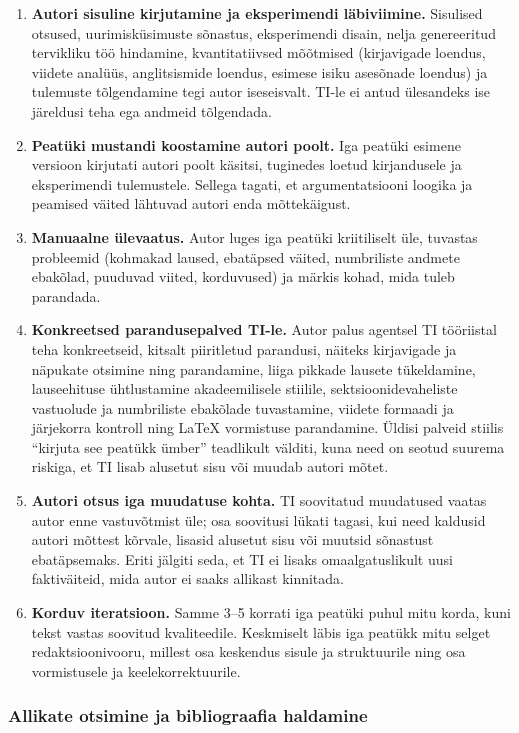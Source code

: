 \begin{enumerate}
    \item \textbf{Autori sisuline kirjutamine ja eksperimendi läbiviimine.} Sisulised otsused, uurimisküsimuste sõnastus, eksperimendi disain, nelja genereeritud tervikliku töö hindamine, kvantitatiivsed mõõtmised (kirjavigade loendus, viidete analüüs, anglitsismide loendus, esimese isiku asesõnade loendus) ja tulemuste tõlgendamine tegi autor iseseisvalt. TI-le ei antud ülesandeks ise järeldusi teha ega andmeid tõlgendada.
    \item \textbf{Peatüki mustandi koostamine autori poolt.} Iga peatüki esimene versioon kirjutati autori poolt käsitsi, tuginedes loetud kirjandusele ja eksperimendi tulemustele. Sellega tagati, et argumentatsiooni loogika ja peamised väited lähtuvad autori enda mõttekäigust.
    \item \textbf{Manuaalne ülevaatus.} Autor luges iga peatüki kriitiliselt üle, tuvastas probleemid (kohmakad laused, ebatäpsed väited, numbriliste andmete ebakõlad, puuduvad viited, korduvused) ja märkis kohad, mida tuleb parandada.
    \item \textbf{Konkreetsed parandusepalved TI-le.} Autor palus agentsel TI tööriistal teha konkreetseid, kitsalt piiritletud parandusi, näiteks kirjavigade ja näpukate otsimine ning parandamine, liiga pikkade lausete tükeldamine, lauseehituse ühtlustamine akadeemilisele stiilile, sektsioonidevaheliste vastuolude ja numbriliste ebakõlade tuvastamine, viidete formaadi ja järjekorra kontroll ning \LaTeX{} vormistuse parandamine. Üldisi palveid stiilis ``kirjuta see peatükk ümber'' teadlikult välditi, kuna need on seotud suurema riskiga, et TI lisab alusetut sisu või muudab autori mõtet.
    \item \textbf{Autori otsus iga muudatuse kohta.} TI soovitatud muudatused vaatas autor enne vastuvõtmist üle; osa soovitusi lükati tagasi, kui need kaldusid autori mõttest kõrvale, lisasid alusetut sisu või muutsid sõnastust ebatäpsemaks. Eriti jälgiti seda, et TI ei lisaks omaalgatuslikult uusi faktiväiteid, mida autor ei saaks allikast kinnitada.
    \item \textbf{Korduv iteratsioon.} Samme 3--5 korrati iga peatüki puhul mitu korda, kuni tekst vastas soovitud kvaliteedile. Keskmiselt läbis iga peatükk mitu selget redaktsioonivooru, millest osa keskendus sisule ja struktuurile ning osa vormistusele ja keelekorrektuurile.
\end{enumerate}

\subsubsection{Allikate otsimine ja bibliograafia haldamine}

